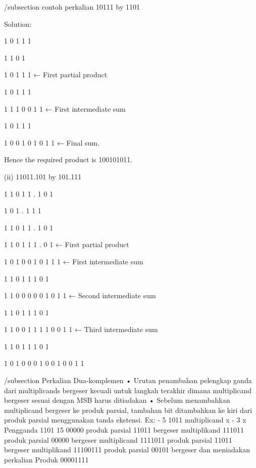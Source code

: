 {/subsection {contoh perkalian}
10111 by 1101

Solution:

                                1 0 1 1 1

                                   1 1 0 1

                                 1 0 1 1 1           ← First partial product

                            1 0 1 1 1     

                            1 1 1 0 0 1 1           ← First intermediate sum

                         1 0 1 1 1          

                       1 0 0 1 0 1 0 1 1           ← Final sum.

Hence the required product is 100101011.


(ii) 11011.101 by 101.111

                                        1 1 0 1 1 . 1 0 1

                                             1 0 1 . 1 1 1  

                                        1 1 0 1 1 . 1 0 1

                                     1 1 0 1 1 1 . 0 1          ← First partial product

                                  1 0 1 0 0 1 0   1 1 1        ← First intermediate sum

                                  1 1 0 1 1 1 0   1        

                               1 1 0 0 0 0 0 1   0 1 1    ← Second intermediate sum

                               1 1 0 1 1 1 0 1              

                             1 1 0 0 1 1 1 1 0   0 1 1        ← Third intermediate sum

                          1 1 0 1 1 1 0 1                    

                       1 0 1 0 0 0 1 0 0 1 0   0 1 1
		     
/subsection {Perkalian Dua-komplemen}
•
Urutan penambahan pelengkap ganda dari multiplicands bergeser
kecuali untuk langkah terakhir dimana multiplicand bergeser sesuai dengan MSB
harus ditiadakan
•
Sebelum menambahkan multiplicand bergeser ke produk parsial, tambahan
bit ditambahkan ke kiri dari produk parsial menggunakan tanda ekstensi.
Ex:
- 5 1011 multiplicand
x
- 3 x
 Pengganda 1101
 15 00000 produk parsial
                                            11011 bergeser multiplikand
                                          111011 produk parsial
                                         00000 bergeser multiplicand
                                       1111011 produk parsial
                                       11011 bergeser multiplikand
                                     11100111 produk parsial
                                     00101 bergeser dan meniadakan perkalian
                                     Produk 00001111
									 

}
